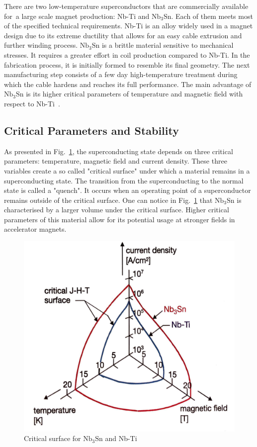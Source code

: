 There are two low-temperature superconductors that are commercially available for~a large scale magnet production: Nb-Ti and $\text{Nb}_3 \text{Sn}$. Each of them meets most of the specified technical requirements. Nb-Ti is an alloy widely used in a magnet design due to its extreme ductility that allows for an easy cable extrusion and further winding process. $\text{Nb}_3 \text{Sn}$ is a brittle material sensitive to mechanical stresses. It requires a greater effort in coil production compared to Nb-Ti. In the fabrication process, it is initially formed to resemble its final geometry. The next manufacturing step consists of a few day high-temperature treatment during which the cable hardens and reaches its full performance. The main advantage of $\text{Nb}_3 \text{Sn}$ is its higher critical parameters of temperature and magnetic field with respect to Nb-Ti~\cite[p.~29-41]{superconducting_accelerator_magnets}.

\subsection{Critical Parameters and Stability}

As presented in Fig.~\ref{fig:scheme_critical_surface}, the superconducting state depends on three critical parameters: temperature, magnetic field and current density. These three variables create a so called "critical surface" under which a material remains in a superconducting state. The transition from the superconducting to the normal state is called a "quench". It occurs when an operating point of a superconductor remains outside of the critical surface. One can notice in Fig.~\ref{fig:scheme_critical_surface} that $\text{Nb}_3 \text{Sn}$ is characterised by a larger volume under the critical surface. Higher critical parameters of this material allow for its potential usage at stronger fields in accelerator magnets.

\begin{figure}[H]
    \centering
    \includegraphics[width=0.35\linewidth]{sections/introduction/figures/critical_surface_scheme.png}
    \caption{Critical surface for $\text{Nb}_\text{3}\text{Sn}$ and Nb-Ti \cite{evans_marvel_of_technology}}
    \label{fig:scheme_critical_surface}
\end{figure} 

